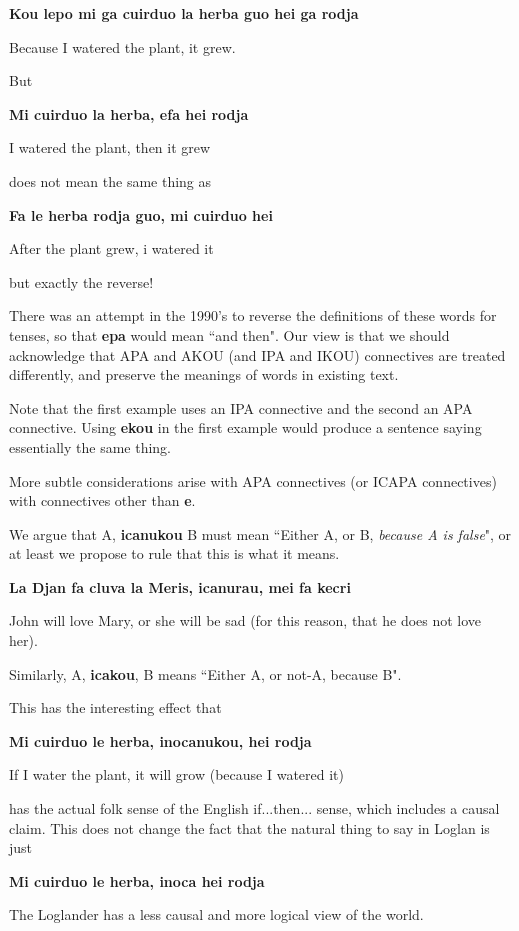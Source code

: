 \documentclass[12pt]{book}
\begin{document}
{{\bf Kou lepo mi ga cuirduo la herba guo hei ga rodja}

Because I watered the plant, it grew.

But

{\bf Mi cuirduo la herba, efa hei rodja}

I watered the plant, then it grew

does not mean the same thing as

{\bf Fa le herba rodja guo, mi cuirduo hei}

After the plant grew, i watered it

but exactly the reverse!

There was an attempt in the 1990's to reverse the definitions of these words for tenses, so that {\bf epa} would mean ``and then".  Our view is that we should acknowledge that APA and AKOU (and IPA and IKOU) connectives are treated differently, and preserve the meanings of words in existing text.

Note that the first example uses an IPA connective and the second an APA connective.  Using {\bf ekou} in the first example would produce a sentence
saying essentially the same thing.  

More subtle considerations arise with APA connectives (or ICAPA connectives) with connectives other than {\bf e}.

We argue that A, {\bf icanukou} B must mean ``Either A, or B, {\em because A is false}", or at least we propose to rule that this is what it means.

{\bf La Djan fa cluva la Meris, icanurau, mei fa kecri}

John will love Mary, or she will be sad (for this reason, that he does not love her).

Similarly, A, {\bf icakou}, B means ``Either A,  or not-A, because B".

This has the interesting effect that

{\bf Mi cuirduo le herba, inocanukou, hei rodja}

If I water the plant, it will grow (because I watered it)

has the actual folk sense of the English if...then... sense, which includes a causal claim.  This does not change the fact that the natural thing to say
in Loglan is just

{\bf Mi cuirduo le herba, inoca hei rodja}

The Loglander has a less causal and more logical view of the world.

}
\end{document}
